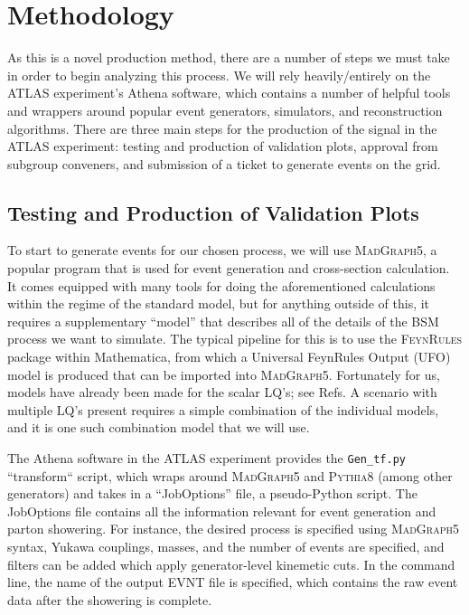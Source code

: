 
\section{Methodology}\label{methodology}
    As this is a novel production method, there are a number of steps we must take in order to begin analyzing this process. We will rely heavily/entirely on the ATLAS experiment's Athena software, which contains a number of helpful tools and wrappers around popular event generators, simulators, and reconstruction algorithms. There are three main steps for the production of the signal in the ATLAS experiment: testing and production of validation plots, approval from subgroup conveners, and submission of a ticket to generate events on the grid.

    \subsection{Testing and Production of Validation Plots}
        To start to generate events for our chosen process, we will use \textsc{MadGraph5}, a popular program that is used for event generation and cross-section calculation. It comes equipped with many tools for doing the aforementioned calculations within the regime of the standard model, but for anything outside of this, it requires a supplementary ``model'' that describes all of the details of the BSM process we want to simulate. The typical pipeline for this is to use the \textsc{FeynRules} package within Mathematica, from which a Universal FeynRules Output (UFO) model is produced that can be imported into \textsc{MadGraph5}. Fortunately for us, models have already been made for the scalar LQ's; see Refs\cite{Dorsner_2018,Dorsner_2021}. A scenario with multiple LQ's present requires a simple combination of the individual models, and it is one such combination model that we will use.

        The Athena software in the ATLAS experiment provides the \texttt{Gen_tf.py} ``transform`` script, which wraps around \textsc{MadGraph5} and \textsc{Pythia8} (among other generators) and takes in a ``JobOptions'' file, a pseudo-Python script. The JobOptions file contains all the information relevant for event generation and parton showering. For instance, the desired process is specified using \textsc{MadGraph5} syntax, Yukawa couplings, masses, and the number of events are specified, and filters can be added which apply generator-level kinemetic cuts. In the command line, the name of the output EVNT file is specified, which contains the raw event data after the showering is complete.

